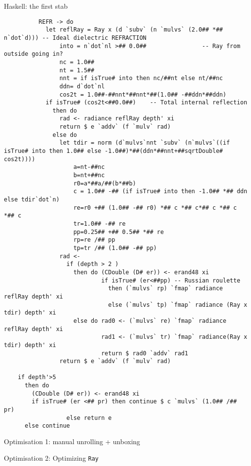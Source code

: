 \documentclass[8pt]{beamer}
\newcommand{\Ray}{\texttt{Ray}}
\begin{document}
\begin{frame}[fragile]{Haskell: the first stab}
{\begin{verbatim}
          REFR -> do
            let reflRay = Ray x (d `subv` (n `mulvs` (2.0## *## n`dot`d))) -- Ideal dielectric REFRACTION
                into = n`dot`nl >## 0.0##                -- Ray from outside going in?
                nc = 1.0##
                nt = 1.5##
                nnt = if isTrue# into then nc/##nt else nt/##nc
                ddn= d`dot`nl
                cos2t = 1.0##-##nnt*##nnt*##(1.0## -##ddn*##ddn)
            if isTrue# (cos2t<##0.0##)    -- Total internal reflection
              then do
                rad <- radiance reflRay depth' xi
                return $ e `addv` (f `mulv` rad)
              else do
                let tdir = norm (d`mulvs`nnt `subv` (n`mulvs`((if isTrue# into then 1.0## else -1.0##)*##(ddn*##nnt+##sqrtDouble# cos2t))))
                    a=nt-##nc
                    b=nt+##nc
                    r0=a*##a/##(b*##b)
                    c = 1.0## -## (if isTrue# into then -1.0## *## ddn else tdir`dot`n)
                    re=r0 +## (1.0## -## r0) *## c *## c*## c *## c *## c 
                    tr=1.0## -## re
                    pp=0.25## +## 0.5## *## re
                    rp=re /## pp
                    tp=tr /## (1.0## -## pp)
                rad <-
                  if (depth > 2 )
                    then do (CDouble (D# er)) <- erand48 xi
                            if isTrue# (er<##pp) -- Russian roulette
                              then (`mulvs` rp) `fmap` radiance reflRay depth' xi
                              else (`mulvs` tp) `fmap` radiance (Ray x tdir) depth' xi
                    else do rad0 <- (`mulvs` re) `fmap` radiance reflRay depth' xi
                            rad1 <- (`mulvs` tr) `fmap` radiance(Ray x tdir) depth' xi
                            return $ rad0 `addv` rad1
                return $ e `addv` (f `mulv` rad)

    if depth'>5
      then do
        (CDouble (D# er)) <- erand48 xi
        if isTrue# (er <## pr) then continue $ c `mulvs` (1.0## /## pr)
                  else return e
      else continue 
\end{verbatim}
}
\end{frame}

\begin{frame}[fragile]{Optimisation 1: manual unrolling + unboxing }
\end{frame}

\begin{frame}[fragile]{Optimisation 2: Optimizing \Ray}
\end{frame}
\end{document}
